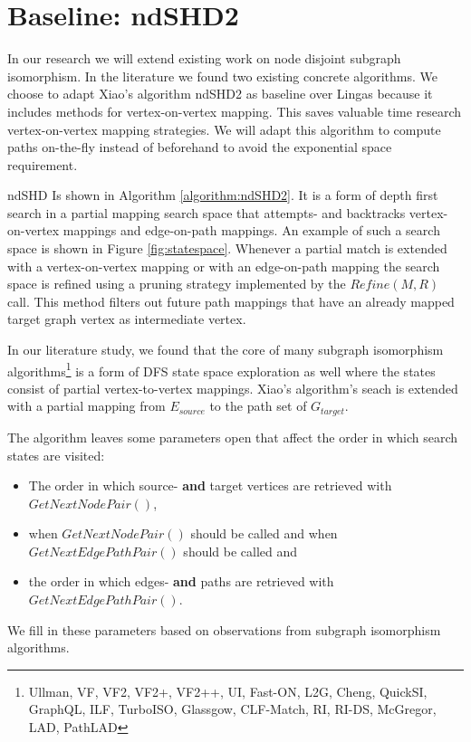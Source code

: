 \section{Baseline: ndSHD2}
In our research we will extend existing work on node disjoint subgraph isomorphism. In the literature we found two existing concrete algorithms. We choose to adapt Xiao's algorithm ndSHD2\cite{XIAONODEDISJOINT} as baseline over Lingas \cite{LINGAS2009464} because it includes methods for vertex-on-vertex mapping. This saves valuable time research vertex-on-vertex mapping strategies. We will adapt this algorithm to compute paths on-the-fly instead of beforehand to avoid the exponential space requirement.

ndSHD Is shown in Algorithm \ref{algorithm:ndSHD2}. It is a form of depth first search in a partial mapping search space that attempts- and backtracks vertex-on-vertex mappings and edge-on-path mappings. An example of such a search space is shown in Figure \ref{fig:statespace}. Whenever a partial match is extended with a vertex-on-vertex mapping or with an edge-on-path mapping the search space is refined using a pruning strategy implemented by the $Refine(M,R)$ call. This method filters out future path mappings that have an already mapped target graph vertex as intermediate vertex.


In our literature study, we found that the core of many subgraph isomorphism algorithms\footnote{Ullman, VF, VF2, VF2+, VF2++, UI, Fast-ON, L2G, Cheng, QuickSI, GraphQL, ILF, TurboISO, Glassgow, CLF-Match, RI, RI-DS, McGregor, LAD, PathLAD} is a form of DFS state space exploration as well where the states consist of partial vertex-to-vertex mappings. Xiao's algorithm's seach is extended with a partial mapping from $E_{source}$ to the path set of $G_{target}$.


The algorithm leaves some parameters open that affect the order in which search states are visited:


\begin{itemize}
\item The order in which source- \textbf{and} target vertices are retrieved with $GetNextNodePair()$,
\item when $GetNextNodePair()$ should be called and when $GetNextEdgePathPair()$ should be called and
\item the order in which edges- \textbf{and} paths are retrieved with $GetNextEdgePathPair()$.
\end{itemize}

We fill in these parameters based on observations from subgraph isomorphism algorithms.

